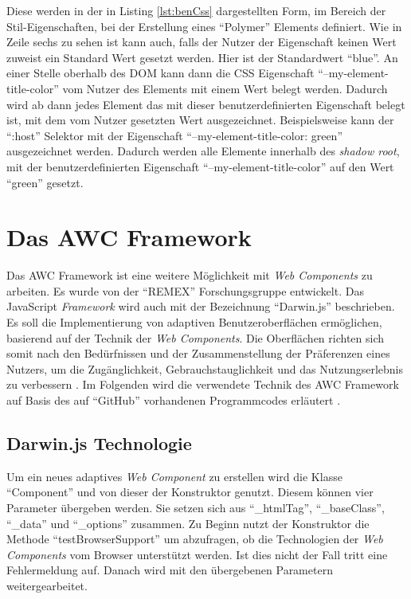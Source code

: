 \documentclass[12pt, paper=a4, bibtotoc, toc=listof, headsepline=true, numbers=endperiod]{scrreprt}
\begin{document}
Diese werden in der in Listing \ref{lst:benCss} dargestellten Form, im Bereich der Stil-Eigenschaften, bei der Erstellung eines \enquote{Polymer} Elements definiert. Wie in Zeile sechs zu sehen ist kann auch, falls der Nutzer der Eigenschaft keinen Wert zuweist ein Standard Wert gesetzt werden. Hier ist der Standardwert \enquote{blue}. An einer Stelle oberhalb des \ac{DOM} kann dann die \ac{CSS} Eigenschaft \enquote{--my-element-title-color} vom Nutzer des Elements mit einem Wert belegt werden. Dadurch wird ab dann jedes Element das mit dieser benutzerdefinierten Eigenschaft belegt ist, mit dem vom Nutzer gesetzten Wert ausgezeichnet. Beispielsweise kann der \enquote{:host} Selektor mit der Eigenschaft \enquote{--my-element-title-color: green} ausgezeichnet werden. Dadurch werden alle Elemente innerhalb des \emph{shadow root}, mit der benutzerdefinierten Eigenschaft \enquote{--my-element-title-color} auf den Wert \enquote{green} gesetzt.
\chapter{Das AWC Framework}	
Das \ac{AWC Framework} ist eine weitere Möglichkeit mit \emph{Web Components} zu arbeiten. Es wurde von der \enquote{REMEX} Forschungsgruppe entwickelt. Das JavaScript \emph{Framework} wird auch mit der Bezeichnung \enquote{Darwin.js} beschrieben. Es soll die Implementierung von adaptiven Benutzeroberflächen ermöglichen, basierend auf der Technik der \emph{Web Components}. Die Oberflächen richten sich somit nach den Bedürfnissen und der Zusammenstellung der Präferenzen eines Nutzers, um die Zugänglichkeit, Gebrauchstauglichkeit und das Nutzungserlebnis zu verbessern \cite{darwin}. Im Folgenden wird die verwendete Technik des \ac{AWC Framework} auf Basis des auf \enquote{GitHub} vorhandenen Programmcodes erläutert \cite{gitHubAwc}. 
\section{Darwin.js Technologie}
Um ein neues adaptives \emph{Web Component} zu erstellen wird die Klasse \enquote{Component} und von dieser der Konstruktor genutzt. Diesem können vier Parameter übergeben werden. Sie setzen sich aus \enquote{\_htmlTag}, \enquote{\_baseClass}, \enquote{\_data} und \enquote{\_options} zusammen. Zu Beginn nutzt der Konstruktor die Methode \enquote{testBrowserSupport} um abzufragen, ob die Technologien der \emph{Web Components} vom Browser unterstützt werden. Ist dies nicht der Fall tritt eine Fehlermeldung auf. Danach wird mit den übergebenen Parametern weitergearbeitet.
\end{document}
